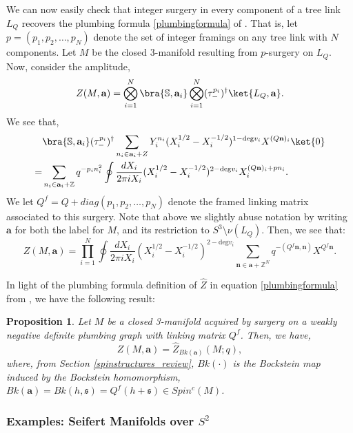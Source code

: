 \documentclass{article}
\newcommand{\Z}{{\mathbb Z}}
\newtheorem{proposition}{Proposition}[section]
\numberwithin{corollary}{theorem}
\numberwithin{corollary}{proposition}
\begin{document}
 We can now easily check that integer surgery in every component of a tree link $L_Q$ recovers the plumbing formula \eqref{plumbingformula} of \cite{GPPV}. That is, let $p=(p_1,p_2,\ldots,p_N)$ denote the set of integer framings on any tree link with $N$ components. Let $M$ be the closed 3-manifold resulting from $p$-surgery on $L_Q$. Now, consider the amplitude,
$$Z(M,\mathbf{a})=\bigotimes^N_{i=1}\bra{\mathbb{S},\mathbf{a}_i} \bigotimes^N_{i=1}(\tau^{p_i}_-)^\dagger \ket{L_Q,\mathbf{a}}.$$
We see that,
\begin{align*}
&\bra{\mathbb{S},\mathbf{a}_i} (\tau^{p_i}_-)^\dagger \sum_{n_i\in \mathbf{a}_i + Z}Y^{n_i}_i (X_i^{1/2} - X_i^{-1/2})^{1-\mathrm{deg}v_i} X^{(Q\mathbf{n})_i}\ket{0}   \\
= & \sum_{n_i\in \mathbf{a}_i + \Z} q^{-p_i n_i^2}\oint \frac{dX_i}{2\pi i X_i} (X_i^{1/2} - X_i^{-1/2})^{2-\mathrm{deg}v_i} X_i^{(Q\mathbf{n})_i + p n_i}.
\end{align*}
We let $Q^f = Q + diag(p_1,p_2,\ldots,p_N)$ denote the framed linking matrix associated to this surgery. Note that above we slightly abuse notation by writing $\mathbf{a}$ for both the label for $M$, and its restriction to $S^3\setminus\nu(L_Q)$. Then, we see that:
$$Z(M,\mathbf{a}) = \prod^N_{i=1}\oint \frac{dX_i}{2\pi i X_i} (X_i^{1/2} - X_i^{-1/2})^{2-\mathrm{deg}v_i} \sum_{\mathbf{n}\in \mathbf{a} + \mathbb{Z}^N} q^{-(Q^f \mathbf{n},\mathbf{n})}X^{Q^f\mathbf{n}}.$$

In light of the plumbing formula definition of $\hat{Z}$ in equation \eqref{plumbingformula} from \cite{GPPV}, we have the following result:
\begin{proposition}\label{Zequalsplumbing}
Let $M$ be a closed 3-manifold acquired by surgery on a weakly negative definite plumbing graph with linking matrix $Q^f$. Then, we have, 
$$Z(M,\mathbf{a}) = \hat{Z}_{Bk(\mathbf{a})}(M;q),$$
where, from Section \ref{spinstructures_review}, $Bk(\cdot)$ is the Bockstein map induced by the Bockstein homomorphism, $Bk(\mathbf{a}) = Bk(h,\mathfrak{s}) = Q^f(h+\mathfrak{s})\in Spin^c(M)$.

\end{proposition}








\subsubsection{Examples: Seifert Manifolds over \texorpdfstring{$S^2$}{S2}}\label{seifert_section}
\end{document}
